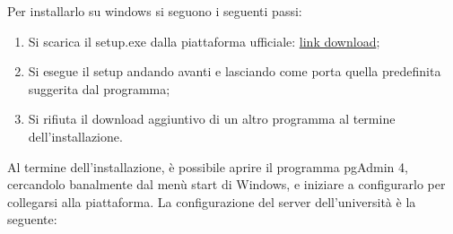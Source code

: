 \documentclass[a4paper]{article}
\begin{document}
	\noindent
	Per installarlo su windows si seguono i seguenti passi:
	\begin{enumerate}
		\item Si scarica il \textsf{setup.exe} dalla piattaforma ufficiale: \href{https://www.postgresql.org/download/}{link download};
		
		\item Si esegue il setup andando avanti e lasciando come porta quella predefinita suggerita dal programma;
		
		\item Si rifiuta il download aggiuntivo di un altro programma al termine dell'installazione.
	\end{enumerate}
	Al termine dell'installazione, è possibile aprire il programma pgAdmin 4, cercandolo banalmente dal menù start di Windows, e iniziare a configurarlo per collegarsi alla piattaforma. La configurazione del server dell'università è la seguente:
\end{document}
